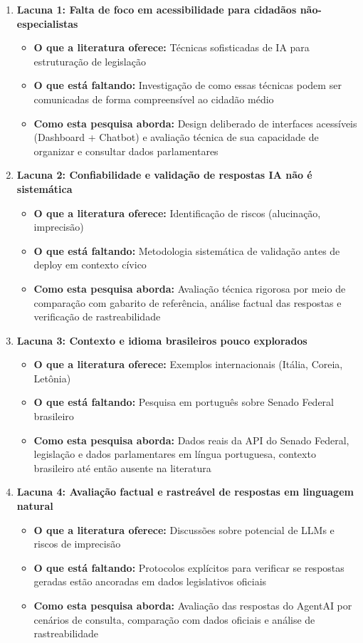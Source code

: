 \begin{enumerate}
    \item \textbf{Lacuna 1: Falta de foco em acessibilidade para cidadãos não-especialistas}
    \begin{itemize}
        \item \textbf{O que a literatura oferece:} Técnicas sofisticadas de IA para estruturação de legislação
        \item \textbf{O que está faltando:} Investigação de como essas técnicas podem ser comunicadas de forma compreensível ao cidadão médio
        \item \textbf{Como esta pesquisa aborda:} Design deliberado de interfaces acessíveis (Dashboard + Chatbot) e avaliação técnica de sua capacidade de organizar e consultar dados parlamentares
    \end{itemize}

    \item \textbf{Lacuna 2: Confiabilidade e validação de respostas IA não é sistemática}
    \begin{itemize}
        \item \textbf{O que a literatura oferece:} Identificação de riscos (alucinação, imprecisão)
        \item \textbf{O que está faltando:} Metodologia sistemática de validação antes de deploy em contexto cívico
        \item \textbf{Como esta pesquisa aborda:} Avaliação técnica rigorosa por meio de comparação com gabarito de referência, análise factual das respostas e verificação de rastreabilidade
    \end{itemize}

    \item \textbf{Lacuna 3: Contexto e idioma brasileiros pouco explorados}
    \begin{itemize}
        \item \textbf{O que a literatura oferece:} Exemplos internacionais (Itália, Coreia, Letônia)
        \item \textbf{O que está faltando:} Pesquisa em português sobre Senado Federal brasileiro
        \item \textbf{Como esta pesquisa aborda:} Dados reais da API do Senado Federal, legislação e dados parlamentares em língua portuguesa, contexto brasileiro até então ausente na literatura
    \end{itemize}

    \item \textbf{Lacuna 4: Avaliação factual e rastreável de respostas em linguagem natural}
    \begin{itemize}
        \item \textbf{O que a literatura oferece:} Discussões sobre potencial de LLMs e riscos de imprecisão
        \item \textbf{O que está faltando:} Protocolos explícitos para verificar se respostas geradas estão ancoradas em dados legislativos oficiais
        \item \textbf{Como esta pesquisa aborda:} Avaliação das respostas do AgentAI por cenários de consulta, comparação com dados oficiais e análise de rastreabilidade
    \end{itemize}


\end{enumerate}
